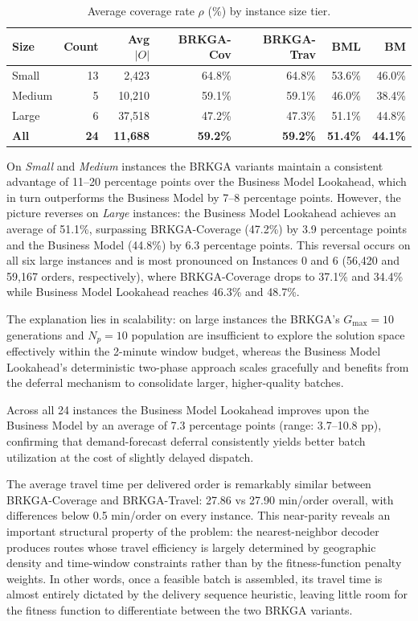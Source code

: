 \documentclass[runningheads]{llncs}
\begin{document}
\begin{table}[ht]
\centering
\caption{Average coverage rate $\rho$ (\%) by instance size tier.}
\label{tab:results_by_size}
\small
\begin{tabular}{l|r|r|r|r|r|r}
\hline
\textbf{Size} & \textbf{Count} & \textbf{Avg $|O|$} &
\textbf{BRKGA-Cov} & \textbf{BRKGA-Trav} &
\textbf{BML} & \textbf{BM} \\
\hline
Small  & 13 & 2{,}423 & 64.8\% & 64.8\% & 53.6\% & 46.0\% \\
Medium &  5 & 10{,}210 & 59.1\% & 59.1\% & 46.0\% & 38.4\% \\
Large  &  6 & 37{,}518 & 47.2\% & 47.3\% & 51.1\% & 44.8\% \\
\textbf{All} & \textbf{24} & \textbf{11{,}688} & \textbf{59.2\%} & \textbf{59.2\%} & \textbf{51.4\%} & \textbf{44.1\%} \\
\hline
\end{tabular}
\end{table}

On \emph{Small} and \emph{Medium} instances the BRKGA variants
maintain a consistent advantage of 11--20 percentage points over
the Business Model Lookahead, which in turn outperforms the
Business Model by 7--8 percentage points.
However, the picture reverses on \emph{Large} instances:
the Business Model Lookahead achieves an average of 51.1\%,
surpassing BRKGA-Coverage (47.2\%) by 3.9 percentage points
and the Business Model (44.8\%) by 6.3 percentage points.
This reversal occurs on all six large instances and is most
pronounced on Instances 0 and 6
(56{,}420 and 59{,}167 orders, respectively),
where BRKGA-Coverage drops to 37.1\% and 34.4\% while
Business Model Lookahead reaches 46.3\% and 48.7\%.

The explanation lies in scalability:
on large instances the BRKGA's $G_{\max} = 10$ generations and
$N_p = 10$ population are insufficient to explore the solution
space effectively within the 2-minute window budget,
whereas the Business Model Lookahead's deterministic two-phase
approach scales gracefully and benefits from the deferral
mechanism to consolidate larger, higher-quality batches.


Across all 24 instances the Business Model Lookahead improves
upon the Business Model by an average of {7.3 percentage
points} (range: 3.7--10.8 pp), confirming that demand-forecast
deferral consistently yields better batch utilization at the
cost of slightly delayed dispatch.

The average travel time per delivered order is remarkably similar between BRKGA-Coverage and BRKGA-Travel: 27.86 vs 27.90 min/order overall, with differences below 0.5 min/order on every instance. This near-parity reveals an important structural property of the problem: the nearest-neighbor decoder produces routes whose travel efficiency is largely determined by geographic density and time-window constraints rather than by the fitness-function penalty weights. In other words, once a feasible batch is assembled, its travel time is almost entirely dictated by the delivery sequence heuristic, leaving little room for the fitness function to differentiate between the two BRKGA variants.
\end{document}
